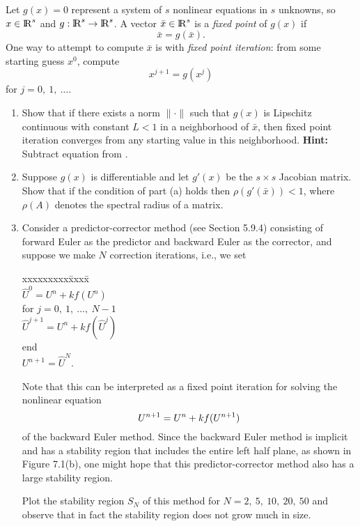 \documentclass[10pt]{article}
\begin{document}
Let $g(x)=0$ represent a system of $s$ nonlinear equations in $s$ unknowns,
so $x\in{{\rm l} \kern -.15em {\rm R} }^s$ and $g: {{\rm l} \kern -.15em {\rm R} }^s \rightarrow {{\rm l} \kern -.15em {\rm R} }^s$.  A vector $\bar
x\in{{\rm l} \kern -.15em {\rm R} }^s$ is a {\em fixed point} of $g(x)$ if 
\begin{equation}\label{a}
\bar x = g(\bar x).
\end{equation}
One way to attempt to compute $\bar x$ is with {\em fixed point iteration}:
from some starting guess $x^0$, compute
\begin{equation}\label{b}
x^{j+1} = g(x^j)
\end{equation}
for $j=0,~1,~\ldots$.

\begin{enumerate}
\item Show that if there exists a norm $\|\cdot\|$ such that $g(x)$ is
Lipschitz continuous with constant $L<1$ in a neighborhood of $\bar x$, then
fixed point iteration converges from any starting value in this
neighborhood.
{\bf Hint:} Subtract equation  from .

\item Suppose $g(x)$ is differentiable and let $g'(x)$ be the $s\times s$
Jacobian matrix.  Show that if the condition of part (a) holds then
$\rho(g'(\bar x)) < 1$, where $\rho(A)$ denotes the spectral radius of a
matrix.

\newpage
\item Consider a predictor-corrector method (see Section 5.9.4) consisting
of forward Euler as the predictor and backward Euler as the corrector, and
suppose we make $N$ correction iterations, i.e., we set
\begin{tabbing}
xxxxxxxxx\=xxxx\=\kill\\
\>$\hat U^0 = U^n + kf(U^n)$\\
\>for $j = 0,~1,~\ldots,~N-1$\\
\>\>$\hat U^{j+1} = U^n + kf(\hat U^j)$\\
\>\>end\\
\>$U^{n+1} = \hat U^N$.
\end{tabbing}
Note that this can be interpreted as a fixed point iteration for solving the
nonlinear equation
\[
U^{n+1} = U^n + kf(U^{n+1})
\]
of the backward Euler method.  Since the backward Euler method is implicit
and has a stability region that includes the entire left half plane, as
shown in Figure 7.1(b), one might hope that this predictor-corrector method
also has a large stability region.

Plot the stability region $S_N$ of this method for $N=2,~5,~10,~20,~50$ 
and observe that in fact the stability region does not grow much in size.


\end{enumerate}
\end{document}
